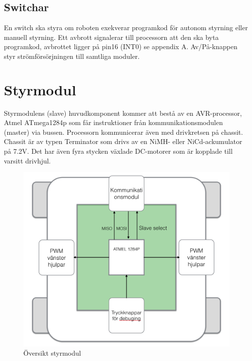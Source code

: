\documentclass[a4paper,12pt,fleqn]{article}
\begin{document}
\subsection{Switchar}
En switch ska styra om roboten exekverar programkod för autonom styrning eller manuell styrning. Ett avbrott signalerar till processorn att den ska byta programkod, avbrottet ligger på pin16 (INT0) se appendix A. 
Av/På-knappen styr strömförsörjningen till samtliga moduler. 


\newpage
\section{Styrmodul}
Styrmodulens (slave) huvudkomponent kommer  att bestå av en AVR-processor, Atmel ATmega1284p som får instruktioner från kommunikationsmodulen (master) via bussen. Processorn kommunicerar även med drivkretsen på chassit. Chassit är av typen Terminator som drivs av en NiMH- eller NiCd-ackumulator på 7.2V. Det har även fyra stycken växlade DC-motorer som är kopplade till varsitt drivhjul. 

\begin{figure}[htp] %
  \begin{center}
  \includegraphics[keepaspectratio=true,scale=0.4]{styrmodul}  %
  \end{center}
  \caption{Översikt styrmodul} %
  \label{fig:styr} %
\end{figure}
\newpage
\end{document}
